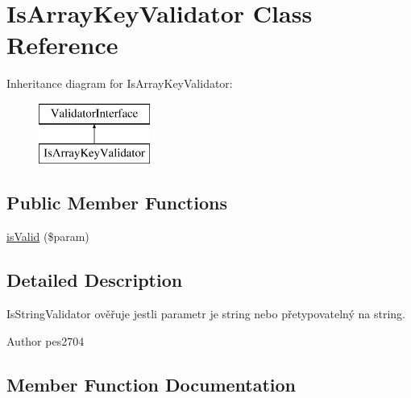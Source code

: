 \hypertarget{class_pes_1_1_validator_1_1_is_array_key_validator}{}\section{Is\+Array\+Key\+Validator Class Reference}
\label{class_pes_1_1_validator_1_1_is_array_key_validator}
Inheritance diagram for Is\+Array\+Key\+Validator\+:\begin{figure}[H]
\begin{center}
\leavevmode
\includegraphics[height=2.000000cm]{class_pes_1_1_validator_1_1_is_array_key_validator}
\end{center}
\end{figure}
\subsection*{Public Member Functions}
\begin{DoxyCompactItemize}
\item 
\mbox{\hyperlink{class_pes_1_1_validator_1_1_is_array_key_validator_a250dbda694ce9c4d0dd4e71e1df35882}{is\+Valid}} (\$param)
\end{DoxyCompactItemize}


\subsection{Detailed Description}
Is\+String\+Validator ověřuje jestli parametr je string nebo přetypovatelný na string.

\begin{DoxyAuthor}{Author}
pes2704 
\end{DoxyAuthor}


\subsection{Member Function Documentation}
\mbox{\label{class_pes_1_1_validator_1_1_is_array_key_validator_a250dbda694ce9c4d0dd4e71e1df35882}} 

